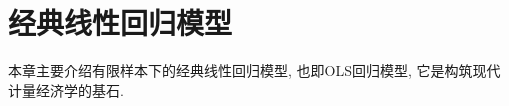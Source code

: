 \documentclass[cn, 12pt, math=mtpro2, bibstyle=apa, blue, twocol]{elegantbook}
\begin{document}







\chapter{经典线性回归模型}
本章主要介绍有限样本下的经典线性回归模型, 也即OLS回归模型, 它是构筑现代计量经济学的基石.
\end{document}
